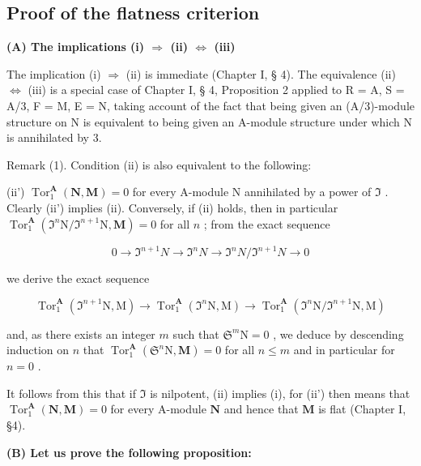 \subsection{Proof of the flatness criterion}

\textbf{(A) The implications (i) \(\Rightarrow\) (ii) \(\Leftrightarrow\) (iii)}\par

The implication (i) \(\Rightarrow\) (ii) is immediate (Chapter I, § 4). The equivalence (ii) \(\Leftrightarrow\) (iii) is a special case of Chapter I, § 4, Proposition 2 applied to R = A, S = A/3, F = M, E = N, taking account of the fact that being given an (A/3)-module structure on N is equivalent to being given an A-module structure under which N is annihilated by 3.

Remark (1). Condition (ii) is also equivalent to the following:

(ii') \(\operatorname{Tor}_1^{\mathbf{A}}(\mathbf{N},\mathbf{M}) = 0\) for every A-module N annihilated by a power of \(\Im\) . Clearly (ii') implies (ii). Conversely, if (ii) holds, then in particular \(\operatorname{Tor}_1^{\mathbf{A}}(\Im^n\mathrm{N} / \Im^{n + 1}\mathrm{N},\mathbf{M}) = 0\) for all \(n\) ; from the exact sequence

\[
0 \rightarrow \Im^ {n + 1} N \rightarrow \Im^ {n} N \rightarrow \Im^ {n} N / \Im^ {n + 1} N \rightarrow 0
\]

we derive the exact sequence

\[
\operatorname{Tor} _ {1} ^ {\mathbf {A}} \left(\Im^ {n + 1} \mathrm{N}, \mathrm{M}\right)\rightarrow \operatorname{Tor} _ {1} ^ {\mathbf {A}} \left(\Im^ {n} \mathrm{N}, \mathrm{M}\right)\rightarrow \operatorname{Tor} _ {1} ^ {\mathbf {A}} \left(\Im^ {n} \mathrm{N} / \Im^ {n + 1} \mathrm{N}, \mathrm{M}\right)
\]

and, as there exists an integer \(m\) such that \(\mathfrak{S}^m\mathrm{N} = 0\) , we deduce by descending induction on \(n\) that \(\operatorname{Tor}_1^{\mathbf{A}}(\mathfrak{S}^n\mathrm{N},\mathbf{M}) = 0\) for all \(n\leqslant m\) and in particular for \(n = 0\) .

It follows from this that if \(\Im\) is nilpotent, (ii) implies (i), for (ii') then means that \(\operatorname{Tor}_1^{\mathbf{A}}(\mathbf{N},\mathbf{M}) = 0\) for every A-module \(\mathbf{N}\) and hence that \(\mathbf{M}\) is flat (Chapter I, §4).

\textbf{(B) Let us prove the following proposition:}\par

